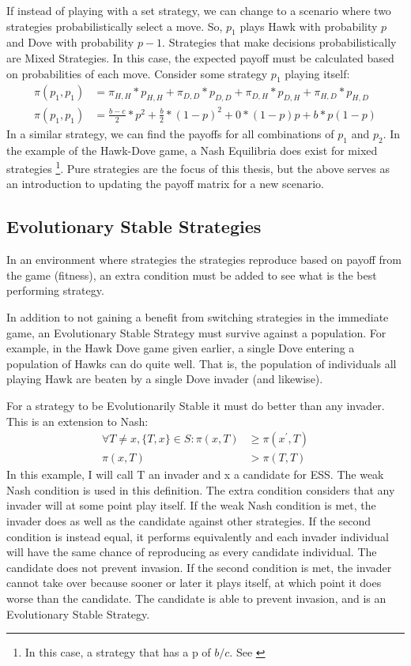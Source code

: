 \documentclass[a4paper,11pt,bcshonoursthesis,singlespace,twoside,thesisdraft,pdflatex]{cssethesis}
\renewcommand{\cite}{\citep} %
\begin{document}
If instead of playing with a set strategy, we can change to a scenario where two strategies probabilistically select a move. So, $p_1$ plays Hawk with probability $p$ and Dove with probability $p-1$. Strategies that make decisions probabilistically are Mixed Strategies. 
In this case, the expected payoff must be calculated based on  probabilities of each move. 
Consider some strategy $p_1$ playing itself: 
\begin{align}
\label{eqn:probabilities}
\pi(p_1,p_1)&=\pi_{H,H}*p_{H,H}+\pi_{D,D}*p_{D,D}+\pi_{D,H}*p_{D,H}+\pi_{H,D}*p_{H,D}\\
\pi(p_1,p_1)&=\frac{b-c}{2}*p^2+\frac{b}{2}*(1-p)^2+0*(1-p)p+b*p(1-p) \nonumber
\end{align}
In a similar strategy, we can find the payoffs for all combinations of $p_1$ and $p_2$. 
In the example of the Hawk-Dove game, a Nash Equilibria does exist for mixed strategies \footnote{In this case, a strategy that has a p of $b/c$. See \cite{Nowakp63}}. Pure strategies are the focus of this thesis, but the above serves as an introduction to updating the payoff matrix for a new scenario. 

\subsection{Evolutionary Stable Strategies}
In an environment where strategies the strategies reproduce based on payoff from the game (fitness), an extra condition must be added to see what is the best performing strategy. 

In addition to not gaining a benefit from switching strategies in the immediate game, an Evolutionary Stable Strategy must survive against a population. 
For example, in the Hawk Dove game given earlier, a single Dove entering a population of Hawks can do quite well. 
That is, the population of individuals all playing Hawk are beaten by a single Dove invader (and likewise). 

For a strategy to be Evolutionarily Stable it must do better than any invader. 
This is an extension to Nash:
\begin{align*}
\forall T \neq x, \{T,x\} \in S: \pi(x,T)&\geq \pi(x^\prime,T) \\ 
\pi(x, T) &> \pi(T,T)
\end{align*}
In this example, I will call T an invader and x a candidate for ESS. 
The weak Nash condition is used in this definition. 
The extra condition considers that any invader will at some point play itself. 
If the weak Nash condition is met, the invader does as well as the candidate against other strategies. 
If the second condition is instead equal, it performs equivalently and each invader individual will have the same chance of reproducing as every candidate individual. 
The candidate does not prevent invasion. 
If the second condition is met, the invader cannot take over because sooner or later it plays itself, at which point it does worse than the candidate. 
The candidate is able to prevent invasion, and is an Evolutionary Stable Strategy. 
\end{document}

